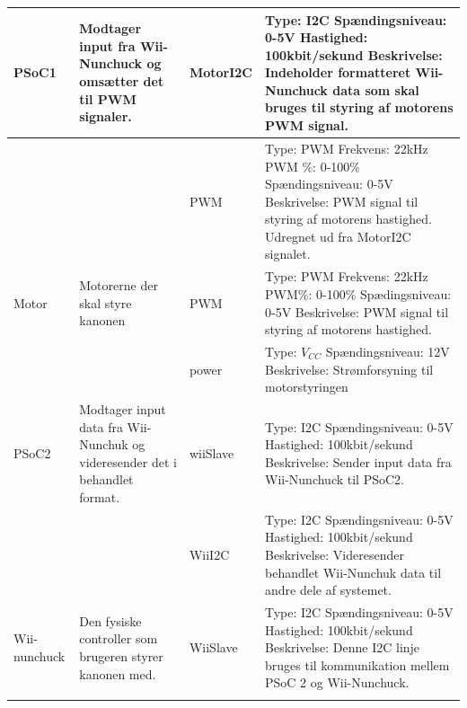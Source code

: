 \begin{longtable}{|>{\hspace{0pt}}p{3cm} | >{\hspace{0pt}}p{3cm} | p{2cm} | p{3cm} |}
		PSoC1 & Modtager input fra Wii-Nunchuck og omsætter det til PWM signaler. & MotorI2C & Type: I2C \newline Spændingsniveau: 0-5V \newline Hastighed: 100kbit/sekund \newline Beskrivelse: Indeholder formatteret Wii-Nunchuck data som skal bruges til styring af motorens PWM signal. \\ \cline{3-4} 
		& & PWM & Type: PWM \newline Frekvens: 22kHz \newline PWM \%: 0-100\% \newline Spændingsniveau: 0-5V \newline Beskrivelse: PWM signal til styring af motorens hastighed. Udregnet ud fra MotorI2C signalet. \\ \hline
		Motor & Motorerne der skal styre kanonen & PWM & Type: PWM \newline Frekvens: 22kHz \newline PWM\%: 0-100\% \newline Spædingsniveau: 0-5V \newline Beskrivelse: PWM signal til styring af motorens hastighed. \\ \cline{3-4}
		 & & power & Type: \(V_{CC}\) \newline Spændingsniveau: 12V \newline Beskrivelse: Strømforsyning til motorstyringen  \\ \hline
		PSoC2 & Modtager input data fra Wii-Nunchuk og videresender det i behandlet format. & wiiSlave & Type: I2C \newline Spændingsniveau: 0-5V \newline Hastighed: 100kbit/sekund \newline Beskrivelse: Sender input data fra Wii-Nunchuck til PSoC2. \\ \cline{3-4}
		 & & WiiI2C & Type: I2C \newline Spændingsniveau: 0-5V \newline Hastighed: 100kbit/sekund \newline Beskrivelse: Videresender behandlet Wii-Nunchuk data til andre dele af systemet. \\ \hline
		Wii-nunchuck & Den fysiske controller som brugeren styrer kanonen med. & WiiSlave & Type: I2C \newline Spændingsniveau: 0-5V \newline Hastighed: 100kbit/sekund \newline Beskrivelse: Denne I2C linje bruges til kommunikation mellem PSoC 2 og Wii-Nunchuck. \\ \cline{3-4}

\end{longtable}
